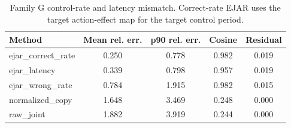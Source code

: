 \begin{table}[t]
\centering
\small
\caption{Family G control-rate and latency mismatch. Correct-rate EJAR uses the target action-effect map for the target control period.}
\label{tab:control-rate}
\begin{tabular}{lcccc}
\toprule
Method & Mean rel. err. & p90 rel. err. & Cosine & Residual \\
\midrule
ejar\_correct\_rate & 0.250 & 0.778 & 0.982 & 0.019 \\
ejar\_latency & 0.339 & 0.798 & 0.957 & 0.019 \\
ejar\_wrong\_rate & 0.784 & 1.915 & 0.982 & 0.015 \\
normalized\_copy & 1.648 & 3.469 & 0.248 & 0.000 \\
raw\_joint & 1.882 & 3.919 & 0.244 & 0.000 \\
\bottomrule
\end{tabular}
\end{table}

